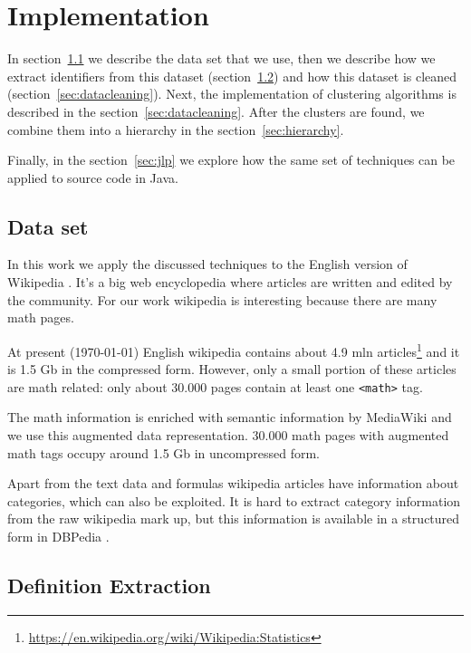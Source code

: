 \section{Implementation} \label{sec:implementation}


In section~\ref{sec:dataset} we describe the data set that we use, 
then we describe how we extract identifiers from this dataset 
(section~\ref{sec:defextraction-impl}) and how this dataset is cleaned
(section~\ref{sec:datacleaning}). Next, the implementation of clustering
algorithms is described in the section~\ref{sec:datacleaning}. After
the clusters are found, we combine them into a hierarchy in 
the section~\ref{sec:hierarchy}. 

Finally, in the section~\ref{sec:jlp} we explore how the same set of techniques
can be applied to source code in Java.


\subsection{Data set} \label{sec:dataset}

In this work we apply the discussed techniques to the English version of
Wikipedia \cite{enwikidump}.
It's a big web encyclopedia where articles are written and edited by 
the community. For our work wikipedia is interesting because 
there are many math pages. 


At present (\today) English wikipedia contains about 4.9 mln
articles\footnote{\url{https://en.wikipedia.org/wiki/Wikipedia:Statistics}}
and it is 1.5 Gb in the compressed form. However, only a small portion
of these articles are math related: only about 30.000 pages contain at least 
one \verb|<math>| tag. 

The math information is enriched with semantic information by MediaWiki 
and we use this augmented data representation. 30.000 math pages with 
augmented math tags occupy around 1.5 Gb in uncompressed form. 

Apart from the text data and formulas wikipedia articles have information
about categories, which can also be exploited. It is hard to 
extract category information from the raw wikipedia mark up, but this 
information is available in a structured form in DBPedia \cite{bizer2009dbpedia}.


\subsection{Definition Extraction} \label{sec:defextraction-impl}


